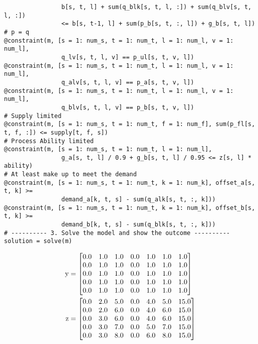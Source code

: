 \documentclass[fleqn,10pt]{wlscirep}
\begin{document}
\begin{lstlisting}
                b[s, t, l] + sum(q_blk[s, t, l, :]) + sum(q_blv[s, t, l, :])
                <= b[s, t-1, l] + sum(p_b[s, t, :, l]) + g_b[s, t, l])
# p = q
@constraint(m, [s = 1: num_s, t = 1: num_t, l = 1: num_l, v = 1: num_l],
                q_lv[s, t, l, v] == p_ul[s, t, v, l])
@constraint(m, [s = 1: num_s, t = 1: num_t, l = 1: num_l, v = 1: num_l],
                q_alv[s, t, l, v] == p_a[s, t, v, l])
@constraint(m, [s = 1: num_s, t = 1: num_t, l = 1: num_l, v = 1: num_l],
                q_blv[s, t, l, v] == p_b[s, t, v, l])
# Supply limited
@constraint(m, [s = 1: num_s, t = 1: num_t, f = 1: num_f], sum(p_fl[s, t, f, :]) <= supply[t, f, s])
# Process Ability limited
@constraint(m, [s = 1: num_s, t = 1: num_t, l = 1: num_l],
                g_a[s, t, l] / 0.9 + g_b[s, t, l] / 0.95 <= z[s, l] * ability)
# At least make up to meet the demand
@constraint(m, [s = 1: num_s, t = 1: num_t, k = 1: num_k], offset_a[s, t, k] >=
                demand_a[k, t, s] - sum(q_alk[s, t, :, k]))
@constraint(m, [s = 1: num_s, t = 1: num_t, k = 1: num_k], offset_b[s, t, k] >=
                demand_b[k, t, s] - sum(q_blk[s, t, :, k]))
# ---------- 3. Solve the model and show the outcome ----------
solution = solve(m)
\end{lstlisting}

\begin{align}
    \text{y} &= {
    \setcounter{MaxMatrixCols}{20}
    \begin{bmatrix}
    0.0 & 1.0 & 1.0 & 0.0 & 1.0 & 1.0 & 1.0 \\ 
    0.0 & 1.0 & 1.0 & 0.0 & 1.0 & 1.0 & 1.0 \\ 
    0.0 & 1.0 & 1.0 & 0.0 & 1.0 & 1.0 & 1.0 \\ 
    0.0 & 1.0 & 1.0 & 0.0 & 1.0 & 1.0 & 1.0 \\
    0.0 & 1.0 & 1.0 & 0.0 & 1.0 & 1.0 & 1.0
    \end{bmatrix}
    }%
    \\ \text{z} &= {
    \setcounter{MaxMatrixCols}{20}
    \begin{bmatrix}
    0.0 & 2.0 & 5.0 & 0.0 & 4.0 & 5.0 & 15.0 \\
    0.0 & 2.0 & 6.0 & 0.0 & 4.0 & 6.0 & 15.0 \\
    0.0 & 3.0 & 6.0 & 0.0 & 4.0 & 6.0 & 15.0 \\
    0.0 & 3.0 & 7.0 & 0.0 & 5.0 & 7.0 & 15.0 \\
    0.0 & 3.0 & 8.0 & 0.0 & 6.0 & 8.0 & 15.0
    \end{bmatrix}
    }%
\end{align}
\end{document}
